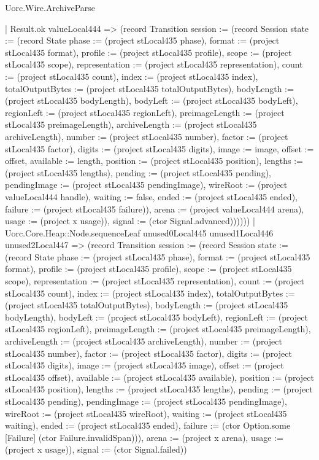 \begin{lexlean}{Uorc.Wire.ArchiveParse}
\begin{semanticmodule}
{              | Result.ok valueLocal444 => (record Transition {session := (record Session {state := (record State {phase := (project stLocal435 phase), format := (project stLocal435 format), profile := (project stLocal435 profile), scope := (project stLocal435 scope), representation := (project stLocal435 representation), count := (project stLocal435 count), index := (project stLocal435 index), totalOutputBytes := (project stLocal435 totalOutputBytes), bodyLength := (project stLocal435 bodyLength), bodyLeft := (project stLocal435 bodyLeft), regionLeft := (project stLocal435 regionLeft), preimageLength := (project stLocal435 preimageLength), archiveLength := (project stLocal435 archiveLength), number := (project stLocal435 number), factor := (project stLocal435 factor), digits := (project stLocal435 digits), image := image, offset := offset, available := length, position := (project stLocal435 position), lengths := (project stLocal435 lengths), pending := (project stLocal435 pending), pendingImage := (project stLocal435 pendingImage), wireRoot := (project valueLocal444 handle), waiting := false, ended := (project stLocal435 ended), failure := (project stLocal435 failure)}), arena := (project valueLocal444 arena), usage := (project x usage)}), signal := (ctor Signal.advanced)})))))
        | Uorc.Core.Heap::Node.sequenceLeaf unused0Local445 unused1Local446 unused2Local447 => (record Transition {session := (record Session {state := (record State {phase := (project stLocal435 phase), format := (project stLocal435 format), profile := (project stLocal435 profile), scope := (project stLocal435 scope), representation := (project stLocal435 representation), count := (project stLocal435 count), index := (project stLocal435 index), totalOutputBytes := (project stLocal435 totalOutputBytes), bodyLength := (project stLocal435 bodyLength), bodyLeft := (project stLocal435 bodyLeft), regionLeft := (project stLocal435 regionLeft), preimageLength := (project stLocal435 preimageLength), archiveLength := (project stLocal435 archiveLength), number := (project stLocal435 number), factor := (project stLocal435 factor), digits := (project stLocal435 digits), image := (project stLocal435 image), offset := (project stLocal435 offset), available := (project stLocal435 available), position := (project stLocal435 position), lengths := (project stLocal435 lengths), pending := (project stLocal435 pending), pendingImage := (project stLocal435 pendingImage), wireRoot := (project stLocal435 wireRoot), waiting := (project stLocal435 waiting), ended := (project stLocal435 ended), failure := (ctor Option.some [Failure] (ctor Failure.invalidSpan))}), arena := (project x arena), usage := (project x usage)}), signal := (ctor Signal.failed)})
}
\end{semanticmodule}
\end{lexlean}
